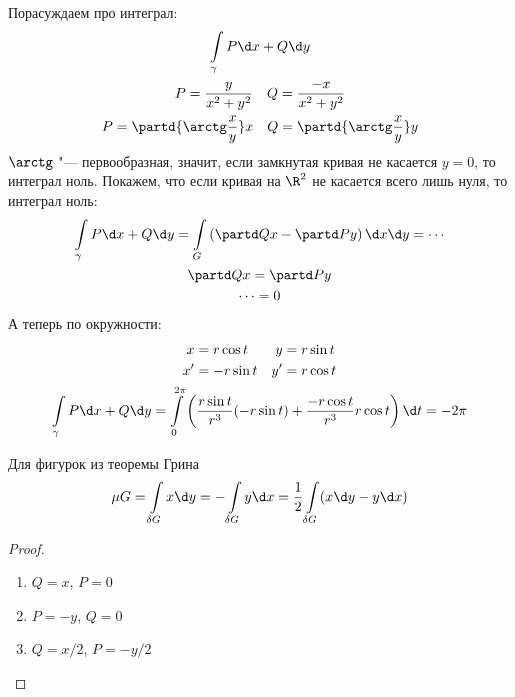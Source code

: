 \begin{exmp}
	Порасуждаем про интеграл:
	\begin{gather*}
		\int\limits_\gamma P \d x + Q \d y \\
		P = \frac{y}{x^2+y^2} \quad Q = \frac{-x}{x^2+y^2} \\
		P = \partd{\arctg \frac{x}y}x \quad Q = \partd{\arctg \frac xy}y
	\end{gather*}
	$\arctg$ "--- первообразная, значит, если замкнутая кривая не касается $y=0$, то интеграл ноль.
	Покажем, что если кривая на $\R^2$ не касается всего лишь нуля, то интеграл ноль:
	\begin{gather*}
		\int\limits_\gamma P \d x + Q \d y
		= \int\limits_G \left(\partd Qx - \partd Py\right) \d x \d y = \cdots \\
		\partd Qx = \partd Py \\
		\cdots = 0 \\
	\end{gather*}
	А теперь по окружности:
	\begin{gather*}
		\begin{aligned}
		x &= r \cos t & y &= r \sin t \\
		x' &= -r \sin t & y' &= r \cos t \\
		\end{aligned} \\
		\int\limits_\gamma P \d x + Q \d y
		= \int\limits_0^{2\pi} \left(\frac{r\sin t}{r^3}(-r\sin t)+\frac{-r\cos t}{r^3}r\cos t\right)\d t=
		-2\pi
	\end{gather*}
\end{exmp}

\begin{conseq}
	Для фигурок из теоремы Грина
	\[ \mu G = \int\limits_{\delta G} x \d y = - \int\limits_{\delta G} y \d x = \frac12 \int\limits_{\delta G} (x \d y - y \d x) \]
\end{conseq}
\begin{proof}
	\begin{enumerate}
		\item $Q = x$, $P = 0$
		\item $P = -y$, $Q = 0$
		\item $Q = x/2$, $P = -y/2$
	\end{enumerate}
\end{proof}
